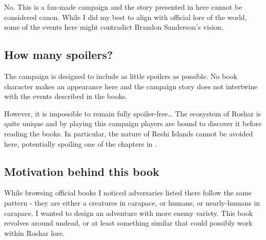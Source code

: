 No. This is a fan-made campaign and the story presented in here cannot be considered canon. While I did my best to align with official lore of the world, some of the events here might contradict Brandon Sanderson’s vision.

\subsection{How many spoilers?}

The campaign is designed to include as little spoilers as possible. No book character makes an appearance here and the campaign story does not intertwine with the events described in the books.

However, it is impossible to remain fully spoiler-free… The ecosystem of Roshar is quite unique and by playing this campaign players are bound to discover it before reading the books. In particular, the nature of Reshi Islands cannot be avoided here, potentially spoiling one of the chapters in \bookWOR{}.

\subsection{Motivation behind this book}

While browsing official \cosmereRPG{} books I noticed adversaries listed there follow the same pattern - they are either a creatures in carapace, or humans, or nearly-humans in carapace. I wanted to design an adventure with more enemy variety. This book revolves around undead, or at least something similar that could possibly work within Roshar lore.